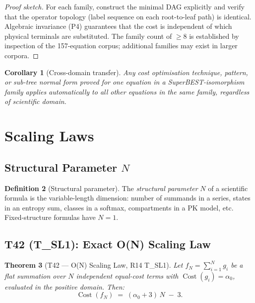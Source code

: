 \documentclass[12pt,a4paper]{article}
\newtheorem{theorem}{Theorem}[section]
\newtheorem{corollary}[theorem]{Corollary}
\theoremstyle{definition}
\newtheorem{definition}[theorem]{Definition}
\newcommand{\Cost}{\operatorname{Cost}}
\begin{document}
\begin{proof}[Proof sketch]
For each family, construct the minimal DAG explicitly and verify that the
operator topology (label sequence on each root-to-leaf path) is identical.
Algebraic invariance (P4) guarantees that the cost is independent of which
physical terminals are substituted.  The family count of $\geq 8$ is
established by inspection of the 157-equation corpus; additional families
may exist in larger corpora.
\end{proof}

\begin{corollary}[Cross-domain transfer]
Any cost optimisation technique, pattern, or sub-tree normal form proved
for one equation in a SuperBEST-isomorphism family applies automatically
to all other equations in the same family, regardless of scientific domain.
\end{corollary}

\section{Scaling Laws}
\label{sec:scaling}

\subsection{Structural Parameter $N$}

\begin{definition}[Structural parameter]
\label{def:N}
The \emph{structural parameter} $N$ of a scientific formula is the
variable-length dimension: number of summands in a series, states in an
entropy sum, classes in a softmax, compartments in a PK model, etc.
Fixed-structure formulas have $N=1$.
\end{definition}

\subsection{T42 (T\_SL1): Exact O(N) Scaling Law}

\begin{theorem}[T42 --- O(N) Scaling Law, R14 T\_SL1]
\label{thm:ON}
Let $f_N = \sum_{i=1}^{N} g_i$ be a flat summation over $N$ independent
equal-cost terms with $\Cost(g_i)=\alpha_0$, evaluated in the positive domain.
Then:
\[
  \boxed{\Cost(f_N) \;=\; (\alpha_0 + 3)\,N \;-\; 3.}
\]
\end{theorem}
\end{document}
